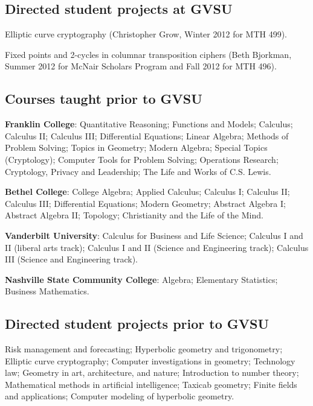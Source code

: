 \documentclass[letterpaper]{article}
\renewenvironment{itemize}{
  \begin{list}{}{
    \setlength{\leftmargin}{1.5em}
	\setlength{\itemsep}{0in}
  }
}{
  \end{list}
}
\begin{document}
\subsection*{Directed student projects at GVSU}
\begin{itemize}
	\item Elliptic curve cryptography (Christopher Grow, Winter 2012 for MTH 499).
	\item Fixed points and 2-cycles in columnar transposition ciphers (Beth Bjorkman, Summer 2012 for McNair Scholars Program and Fall 2012 for MTH 496). 
\end{itemize}


\subsection*{Courses taught prior to GVSU}

\begin{itemize}
	\item \textbf{Franklin College}: Quantitative Reasoning; Functions and Models; Calculus; Calculus II; Calculus III; Differential Equations; Linear Algebra; Methods of Problem Solving; Topics in Geometry; Modern Algebra; Special Topics (Cryptology); Computer Tools for Problem Solving; Operations Research; Cryptology, Privacy and Leadership; The Life and Works of C.S. Lewis.  
	\item \textbf{Bethel College}: College Algebra; Applied Calculus; Calculus I; Calculus II; Calculus III; Differential Equations; Modern Geometry; Abstract Algebra I; Abstract Algebra II; Topology; Christianity and the Life of the Mind. 
	\item \textbf{Vanderbilt University}: Calculus for Business and Life Science; Calculus I and II (liberal arts track); Calculus I and II (Science and Engineering track); Calculus III (Science and Engineering track). 
	\item \textbf{Nashville State Community College}: Algebra; Elementary Statistics; Business Mathematics. 
\end{itemize}


\subsection*{Directed student projects prior to GVSU}

Risk management and forecasting; Hyperbolic geometry and trigonometry; Elliptic curve cryptography; Computer investigations in geometry; Technology law; Geometry in art, architecture, and nature; Introduction to number theory; Mathematical methods in artificial intelligence; Taxicab geometry; Finite fields and applications; Computer modeling of hyperbolic geometry. 
\end{document}
